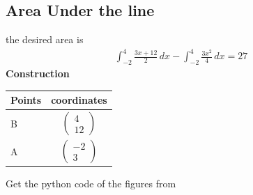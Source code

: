 \documentclass[10pt,a4paper]{report}
\newcommand{\myvec}[1]{\ensuremath{\begin{pmatrix}#1\end{pmatrix}}}
\begin{document}
\begin{multicols}{2}
\subsection*{Area Under the line}
\fi
the desired area is 
\begin{align}
\int_{-2}^{4} \frac{3x+12}{2} \,dx
-\int_{-2}^{4}\frac{3x^2}{4} \,dx 
= 27 
\end{align}
\iffalse
 \vspace{2mm} \textbf{Construction}
\begin{center}
\setlength{\arrayrulewidth}{0.5mm}
\setlength{\tabcolsep}{6pt}
\renewcommand{\arraystretch}{1.5}
    \begin{tabular}{|l|c|}
    \hline 
    \textbf{Points} & \textbf{coordinates} \\ \hline
   B & $\myvec{
   4\\
   12
   } $ \\\hline
   A & $\myvec{
   -2\\
   3
   } $ \\\hline
      \end{tabular}
  \end{center}
  \end{multicols}
 
Get the python code of the figures from

\begin{table}[h]
\large
\centering
{}

\end{table} 
 
\end{document}
